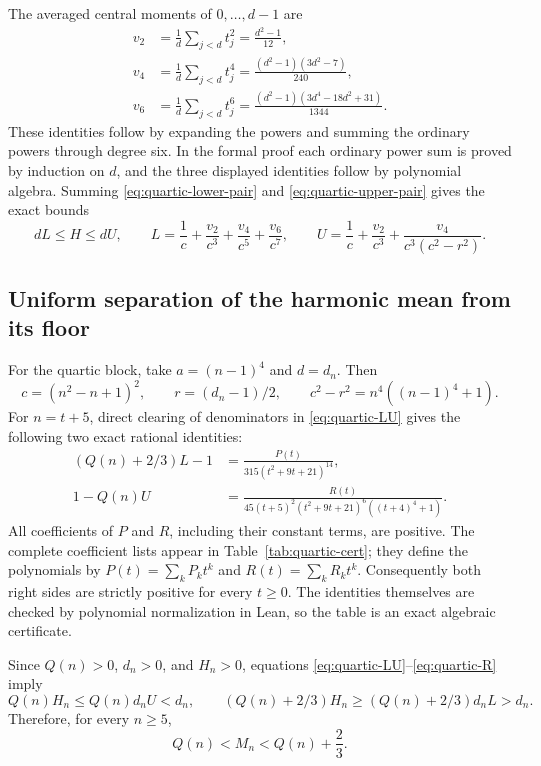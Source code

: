 The averaged central moments of $0,\ldots,d-1$ are
\begin{align*}
 v_2&=\frac1d\sum_{j<d}t_j^2=\frac{d^2-1}{12},\\
 v_4&=\frac1d\sum_{j<d}t_j^4=\frac{(d^2-1)(3d^2-7)}{240},\\
 v_6&=\frac1d\sum_{j<d}t_j^6=\frac{(d^2-1)(3d^4-18d^2+31)}{1344}.
\end{align*}
These identities follow by expanding the powers and summing the ordinary
powers through degree six. In the formal proof each ordinary power sum
is proved by induction on $d$, and the three displayed identities follow
by polynomial algebra. Summing \eqref{eq:quartic-lower-pair} and
\eqref{eq:quartic-upper-pair} gives the exact bounds
\begin{equation}\label{eq:quartic-LU}
 dL\le H\le dU,\qquad
 L=\frac1c+\frac{v_2}{c^3}+\frac{v_4}{c^5}+\frac{v_6}{c^7},\qquad
 U=\frac1c+\frac{v_2}{c^3}+\frac{v_4}{c^3(c^2-r^2)}.
\end{equation}

\subsection{Uniform separation of the harmonic mean from its floor}

For the quartic block, take $a=(n-1)^4$ and $d=d_n$. Then
\[
 c=(n^2-n+1)^2,\qquad r=(d_n-1)/2,\qquad
 c^2-r^2=n^4((n-1)^4+1).
\]
For $n=t+5$, direct clearing of denominators in \eqref{eq:quartic-LU}
gives the following two exact rational identities:
\begin{align}
 (Q(n)+2/3)L-1
 &=\frac{P(t)}{315(t^2+9t+21)^{14}},\label{eq:quartic-P}\\
 1-Q(n)U
 &=\frac{R(t)}{45(t+5)^2(t^2+9t+21)^6((t+4)^4+1)}.
 \label{eq:quartic-R}
\end{align}
All coefficients of $P$ and $R$, including their constant terms, are
positive. The complete coefficient lists appear in Table~\ref{tab:quartic-cert};
they define the polynomials by $P(t)=\sum_kP_kt^k$ and
$R(t)=\sum_kR_kt^k$. Consequently both right sides are strictly positive
for every $t\ge0$. The identities themselves are checked by polynomial
normalization in Lean, so the table is an exact algebraic certificate.

Since $Q(n)>0$, $d_n>0$, and $H_n>0$, equations
\eqref{eq:quartic-LU}--\eqref{eq:quartic-R} imply
\[
 Q(n)H_n\le Q(n)d_nU<d_n,
 \qquad
 (Q(n)+2/3)H_n\ge (Q(n)+2/3)d_nL>d_n.
\]
Therefore, for every $n\ge5$,
\begin{equation}\label{eq:quartic-sandwich}
 Q(n)<M_n<Q(n)+\frac23.
\end{equation}

